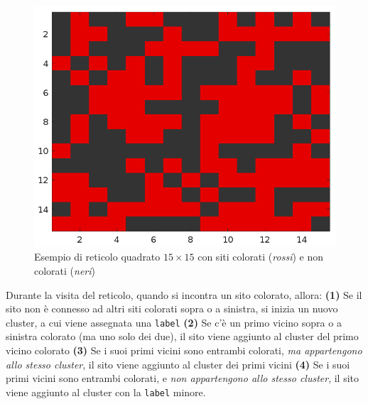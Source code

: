 \begin{figure}[H]
\begin{minipage}{0.4\textwidth}
\begin{tabular}{|*{15}{c|}}
			\hline
		\end{tabular}
	\end{minipage}
	\hfill
	\begin{minipage}{0.44\textwidth}
		\centering
		\includegraphics[width=\linewidth]{images/basegrid}
	\end{minipage}
	\label{fig:basegrid}
	\caption{Esempio di reticolo quadrato $15 \times 15$ con siti colorati (\textit{rossi}) e non colorati (\textit{neri})}
\end{figure}
\noindent
Durante la visita del reticolo, quando si incontra un sito colorato, allora: \textbf{(1)} Se il sito non è connesso ad altri siti colorati sopra o a sinistra, si inizia un nuovo cluster, a cui viene assegnata una \texttt{label} \textbf{(2)} Se c’è un primo vicino sopra o a sinistra colorato (ma uno solo dei due), il sito viene aggiunto al cluster del primo vicino colorato \textbf{(3)} Se i suoi primi vicini sono entrambi colorati, \textit{ma appartengono allo stesso cluster}, il sito viene aggiunto al cluster dei primi vicini \textbf{(4)} Se i suoi primi vicini sono entrambi colorati, e \textit{non appartengono allo stesso cluster}, il sito viene aggiunto al cluster con la \texttt{label} minore. 
